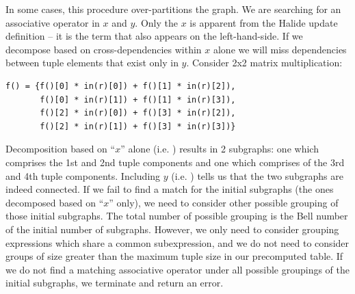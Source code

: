 In some cases, this procedure over-partitions the graph. We are searching for an associative operator in $x$ and $y$. Only the $x$ is apparent from the Halide update definition -- it is the term that also appears on the left-hand-side. If we decompose based on cross-dependencies within $x$ alone we will miss dependencies between tuple elements that exist only in $y$. Consider 2x2 matrix multiplication:

\begin{lstlisting}[caption={2x2 matrix multiplication. The four tuple components are the components in a 2x2 matrix in row order.}]
f() = {f()[0] * in(r)[0]) + f()[1] * in(r)[2]),
       f()[0] * in(r)[1]) + f()[1] * in(r)[3]),
       f()[2] * in(r)[0]) + f()[3] * in(r)[2]),
       f()[2] * in(r)[1]) + f()[3] * in(r)[3])}
\end{lstlisting}

Decomposition based on ``$x$'' alone (i.e. ) results in 2 subgraphs: one which comprises the 1st and 2nd tuple components and one which comprises of the 3rd and 4th tuple components. Including $y$ (i.e. ) tells us that the two subgraphs are indeed connected. If we fail to find a match for the initial subgraphs (the ones decomposed based on ``$x$'' only), we need to consider other possible grouping of those initial subgraphs. The total number of possible grouping is the Bell number of the initial number of subgraphs. However, we only need to consider grouping expressions which share a common subexpression, and we do not need to consider groups of size greater than the maximum tuple size in our precomputed table. If we do not find a matching associative operator under all possible groupings of the initial subgraphs, we terminate and return an error. 

